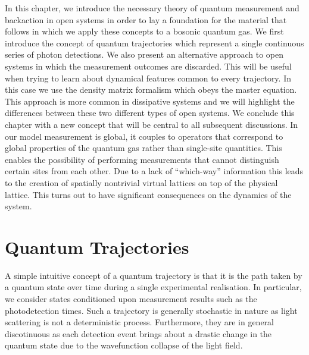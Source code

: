 In this chapter, we introduce the necessary theory of quantum
measurement and backaction in open systems in order to lay a
foundation for the material that follows in which we apply these
concepts to a bosonic quantum gas. We first introduce the concept of
quantum trajectories which represent a single continuous series of
photon detections. We also present an alternative approach to open
systems in which the measurement outcomes are discarded. This will be
useful when trying to learn about dynamical features common to every
trajectory. In this case we use the density matrix formalism which
obeys the master equation. This approach is more common in dissipative
systems and we will highlight the differences between these two
different types of open systems. We conclude this chapter with a new
concept that will be central to all subsequent discussions. In our
model measurement is global, it couples to operators that correspond
to global properties of the quantum gas rather than single-site
quantities. This enables the possibility of performing measurements
that cannot distinguish certain sites from each other. Due to a lack
of ``which-way'' information this leads to the creation of spatially
nontrivial virtual lattices on top of the physical lattice. This turns
out to have significant consequences on the dynamics of the system.

\section{Quantum Trajectories}

A simple intuitive concept of a quantum trajectory is that it is the
path taken by a quantum state over time during a single experimental
realisation. In particular, we consider states conditioned upon
measurement results such as the photodetection times. Such a
trajectory is generally stochastic in nature as light scattering is
not a deterministic process. Furthermore, they are in general
discotinuous as each detection event brings about a drastic change in
the quantum state due to the wavefunction collapse of the light field.


